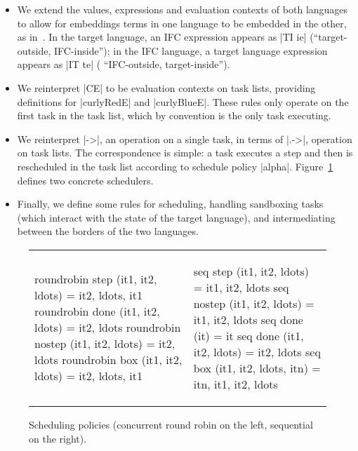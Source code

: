 \begin{itemize}
    \item We extend the values, expressions and evaluation contexts of
      both languages to allow for embeddings terms in one language to
      be embedded in the other, as
      in~\cite{Matthews:2007:OSM:1190216.1190220}.
In the target language, an IFC expression appears as |TI ie| (``target-outside,
IFC-inside''); in the IFC language, a target language expression appears as |IT
te| ( ``IFC-outside, target-inside'').
    \item We reinterpret |CE| to be evaluation contexts on task lists, providing definitions for |curlyRedE| and |curlyBlueE|.  These rules only operate on the first task in the task list, which by convention is the only task executing.
    \item We reinterpret |->|, an operation on a single task, in terms of |.->|, operation on task lists.  The correspondence is simple: a task executes a step and then is rescheduled in the task list according to schedule policy |alpha|.
    Figure~\ref{fig:scheduler} defines two concrete schedulers.
    \item Finally, we define some rules for scheduling, handling sandboxing tasks (which interact with the state of the target language),
    and intermediating between the borders of the two languages.
\end{itemize}

\begin{figure}
\begin{tabular}{ll}
\begin{minipage}{.45\textwidth}
\begin{code}
  roundrobin step (it1, it2, ldots)    = it2, ldots, it1
  roundrobin done (it1, it2, ldots)    = it2, ldots
  roundrobin nostep (it1, it2, ldots)  = it2, ldots
  roundrobin box (it1, it2, ldots)     = it2, ldots, it1
\end{code}
\end{minipage} &
\begin{minipage}{.45\textwidth}
\begin{code}
  seq step (it1, it2, ldots)      = it1, it2, ldots
  seq nostep (it1, it2, ldots)    = it1, it2, ldots
  seq done (it)                   = it
  seq done (it1, it2, ldots)      = it2, ldots
  seq box (it1, it2, ldots, itn)  = itn, it1, it2, ldots
\end{code}
\end{minipage}
\end{tabular}
\vspace*{-0.5cm}
\caption{Scheduling policies (concurrent round robin on the left, sequential on the right).}
\label{fig:scheduler}
\end{figure}

